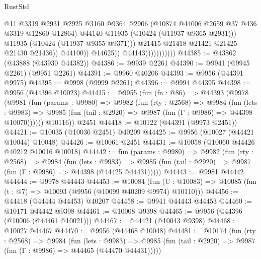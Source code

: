 \begin{lexlean}{RustStd}
\begin{coremodule}
                                          @11
                                          @3319
                                          @2931
                                          @2925
                                          @3160
                                          @9364
                                          @2906
                                          (@10874 @44006 @2659 @37 @436 @3319 @12860 @12864)
                                          @44140
                                          @11935
                                          (@10424 (@11937 @9365 @2931)))
                                        @11935
                                        (@10424 (@11937 @9355 @9371)))
                                      @21415
                                      @21418
                                      @21421
                                      @21425
                                      @21430
                                      @21436))
                                  @44100))
                              @14625))
                          @44143)))))))))))
@44385 := @43862 (@43888 (@43930 @44382))
@44386 := @9939 @2261
@44390 := @9941 (@9945 @2261) (@9951 @2261)
@44391 := @9960 @40206
@44393 := @9956 (@44391 @9975)
@44395 := @9998 (@9999 @2261)
@44396 := @9994 @44395
@44398 := @9956 (@44396 @10023)
@44415 := @9955
    (fun (fn : @86) =>
    @44393
      (@9978
        (@9981
          (fun (params : @9980) =>
          @9982
            (fun (rty : @2568) =>
            @9984
              (fun (lets : @9983) =>
              @9985 (fun (tail : @2920) => @9987 (fun (Γ : @9986) => @44398 @10070))))))
        @10116))
    @2451
@44418 := @10122 (@44391 (@9973 @2451))
@44421 := @10035 (@10036 @2451) @40209
@44425 := @9956 (@10027 (@44421 @10044) @10048)
@44426 := @10061 @2451
@44431 := @10058 (@10060 @44426 @40212 @10016 @10018)
@44442 := fun (params : @9980) =>
  @9982
    (fun (rty : @2568) =>
    @9984
      (fun (lets : @9983) =>
      @9985 (fun (tail : @2920) => @9987 (fun (Γ : @9986) => @44398 (@44425 @44431)))))
@44443 := @9981 @44442
@44444 := @9978 @44443
@44453 := @10084
    (fun (U : @10083) => @10085 (fun (t : @7) => @10093 (@9956 (@10099 @40209 @9974) @10110)))
@44456 := @44418 (@44444 @44453) @40207
@44458 := @9941 @44443 @44453
@44460 := @10171 @44442 @9398
@44461 := @10008 @9398
@44465 := @9956 (@44396 (@10006 (@44461 @10021)))
@44467 := @44421 (@10043 @9398)
@44468 := @10027 @44467
@44470 := @9956 (@44468 @10048)
@44481 := @10174
    (fun (rty : @2568) =>
    @9984
      (fun (lets : @9983) =>
      @9985 (fun (tail : @2920) => @9987 (fun (Γ : @9986) => @44465 (@44470 @44431)))))

\end{coremodule}
\end{lexlean}
